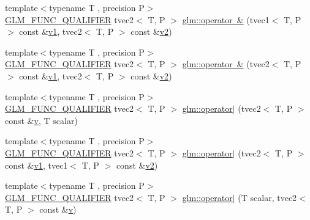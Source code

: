 \begin{DoxyCompactItemize}
\item 
{\footnotesize template$<$typename T , precision P$>$ }\\\mbox{\hyperlink{setup_8hpp_a33fdea6f91c5f834105f7415e2a64407}{G\+L\+M\+\_\+\+F\+U\+N\+C\+\_\+\+Q\+U\+A\+L\+I\+F\+I\+ER}} tvec2$<$ T, P $>$ \mbox{\hyperlink{namespaceglm_a385982d1098e10612ed4d4cb0fd93520}{glm\+::operator \&}} (tvec1$<$ T, P $>$ const \&\mbox{\hyperlink{glad_8h_a0779c3b73f9aa3a0ac5b0139b5d291d9}{v1}}, tvec2$<$ T, P $>$ const \&\mbox{\hyperlink{glad_8h_a9a09a1837922b2b806f4589096a52049}{v2}})
\item 
{\footnotesize template$<$typename T , precision P$>$ }\\\mbox{\hyperlink{setup_8hpp_a33fdea6f91c5f834105f7415e2a64407}{G\+L\+M\+\_\+\+F\+U\+N\+C\+\_\+\+Q\+U\+A\+L\+I\+F\+I\+ER}} tvec2$<$ T, P $>$ \mbox{\hyperlink{namespaceglm_a29dfb710283ba0a13c77b92d649ec1c6}{glm\+::operator \&}} (tvec2$<$ T, P $>$ const \&\mbox{\hyperlink{glad_8h_a0779c3b73f9aa3a0ac5b0139b5d291d9}{v1}}, tvec2$<$ T, P $>$ const \&\mbox{\hyperlink{glad_8h_a9a09a1837922b2b806f4589096a52049}{v2}})
\item 
{\footnotesize template$<$typename T , precision P$>$ }\\\mbox{\hyperlink{setup_8hpp_a33fdea6f91c5f834105f7415e2a64407}{G\+L\+M\+\_\+\+F\+U\+N\+C\+\_\+\+Q\+U\+A\+L\+I\+F\+I\+ER}} tvec2$<$ T, P $>$ \mbox{\hyperlink{namespaceglm_a2ec67fb4e3f080ca67edde50027a47c6}{glm\+::operator$\vert$}} (tvec2$<$ T, P $>$ const \&\mbox{\hyperlink{glad_8h_a14cfbe2fc2234f5504618905b69d1e06}{v}}, T scalar)
\item 
{\footnotesize template$<$typename T , precision P$>$ }\\\mbox{\hyperlink{setup_8hpp_a33fdea6f91c5f834105f7415e2a64407}{G\+L\+M\+\_\+\+F\+U\+N\+C\+\_\+\+Q\+U\+A\+L\+I\+F\+I\+ER}} tvec2$<$ T, P $>$ \mbox{\hyperlink{namespaceglm_abe0f23130730ecbfa232b79acee6347d}{glm\+::operator$\vert$}} (tvec2$<$ T, P $>$ const \&\mbox{\hyperlink{glad_8h_a0779c3b73f9aa3a0ac5b0139b5d291d9}{v1}}, tvec1$<$ T, P $>$ const \&\mbox{\hyperlink{glad_8h_a9a09a1837922b2b806f4589096a52049}{v2}})
\item 
{\footnotesize template$<$typename T , precision P$>$ }\\\mbox{\hyperlink{setup_8hpp_a33fdea6f91c5f834105f7415e2a64407}{G\+L\+M\+\_\+\+F\+U\+N\+C\+\_\+\+Q\+U\+A\+L\+I\+F\+I\+ER}} tvec2$<$ T, P $>$ \mbox{\hyperlink{namespaceglm_aba41797456237ab5d11bc610cb7215a6}{glm\+::operator$\vert$}} (T scalar, tvec2$<$ T, P $>$ const \&\mbox{\hyperlink{glad_8h_a14cfbe2fc2234f5504618905b69d1e06}{v}})

\end{DoxyCompactItemize}
